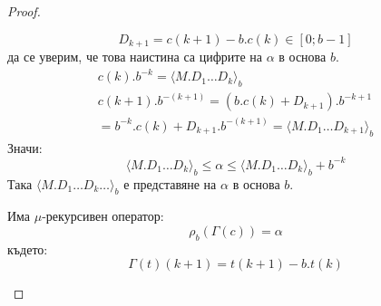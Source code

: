 \begin{proof}
\begin{itemize}
\begin{itemize}
            \begin{equation}
                D_{k+1} = c(k+1) - b.c(k) \in [0; b-1]
            \end{equation}
            да се уверим, че това наистина са цифрите на $\alpha$ в основа $b$.
            \begin{equation}
                \begin{split}
                    c(k).b^{-k} = \langle M.D_1 \dots D_k\rangle_b \\
                    c(k+1).b^{-(k+1)} = (b.c(k) + D_{k+1}).b^{-k+1} \\
                    = b^{-k}.c(k) + D_{k+1}.b^{-(k+1)} = \langle M.D_1 \dots D_{k+1}\rangle_b
                \end{split}
            \end{equation}
            Значи:
            \begin{equation}
                \langle M.D_1 \dots D_k\rangle_b \leq \alpha \leq \langle M.D_1 \dots D_k \rangle_b + b^{-k}
            \end{equation}
            Така $\langle M.D_1 \dots D_k \dots \rangle_b$ е представяне на $\alpha$ в основа $b$.

            Има $\mu$-рекурсивен оператор:
            \begin{equation}
                \rho_b(\Gamma(c)) = \alpha
            \end{equation}
            където:
            \begin{equation}
                \Gamma(t)(k+1) = t(k+1) - b.t(k)
            \end{equation}


\end{itemize}
\end{itemize}
\end{proof}
